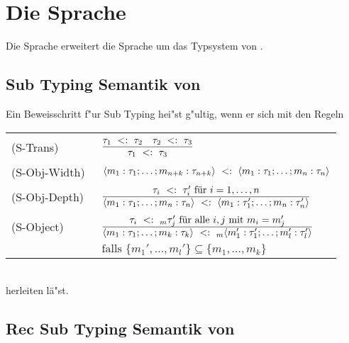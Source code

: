 \section{Die Sprache \LTWOOSUB}
Die Sprache \LTWOOSUB erweitert die Sprache \LTWOSUB um das Typsystem von \LTWOO. 

\subsection{Sub Typing Semantik von \LTWOOSUB}

Ein Beweisschritt f"ur Sub Typing hei"st g"ultig, wenn er sich mit den Regeln  \\[5mm]
  \begin{tabular}{ll}
    \mbox{(S-Trans)\ }      & $\RULE{\subtype{\tau_1} {\tau_2} \quad \subtype{\tau_2} {\tau_3}}
                              {\subtype{\tau_1} {\tau_3}}$ \\[4mm]
    \mbox{(S-Obj-Width)\ }  & $\langle m_1:\tau_1;\ldots;m_{n+k}:\tau_{n+k}\rangle\ <:\ \langle m_1:\tau_1;\ldots;m_n:\tau_n\rangle$ \\[2mm]
    \mbox{(S-Obj-Depth)\ }  & $\RULE{\subtype{\tau_i} {\tau_i'} \text{ f\"ur } i=1,\ldots,n}
                              {\subtype{\typeObject{m_1:\tau_1;\ldots;m_n:\tau_n}}
                               {\typeObject{m_1:\tau_1';\ldots;m_n:\tau_n'}}}$ \\[5mm]
    \mbox{(S-Object)\ }    & $\RULE{\subtype{\tau_i} {_m \tau_j'} \text{ f\"ur alle } i,j \text{ mit } m_i = m_j'}
                              {\subtype{\typeObject{m_1:\tau_1;\ldots;m_k:\tau_k}}
                               {_m \typeObject{m_1':\tau_1';\ldots;m_l':\tau_l'}}}$ \\[4mm]
                      & $\text{falls } \{m_1',\ldots,m_l'\} \subseteq \{m_1,\ldots,m_k\}$
  \end{tabular} \\[7mm]

herleiten l\"a"st.

\subsection{Rec Sub Typing Semantik von \LTWOOSUB} 

